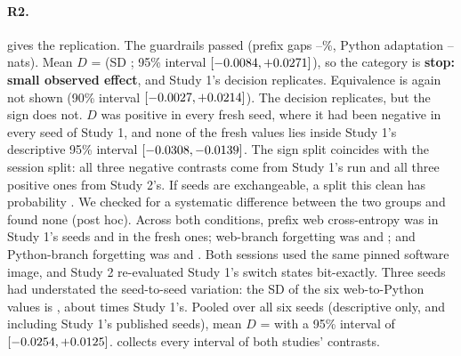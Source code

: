 \documentclass[11pt]{article}
\begin{document}
\begin{table}[t]
\centering
\small
\caption{R2: the web $\to$ Python contrast $D$ on the fresh seeds, with Study 1's estimand and rules (nats/token;
full development set). ``Code gain'' is the drop in non-W Python cross-entropy from the switch. Study 1's seeds
101--103 are in \cref{tab:primary}.}
\label{tab:s2replication}

\end{table}

\paragraph{R2.}  gives the replication. The guardrails passed (prefix gaps
\repGapMin--\repGapMax\%, Python adaptation \repAdaptMin--\repAdaptMax{} nats). Mean $D$ = \repDmean{} (SD
\repDsd; 95\% interval $[-0.0084, {+}0.0271]$), so the category is \textbf{stop: small observed effect}, and Study
1's decision replicates. Equivalence is again not shown (90\% interval $[-0.0027, {+}0.0214]$). The
decision replicates, but the sign does not. $D$ was positive in every fresh seed, where it had been negative in
every seed of Study 1, and none of the fresh values lies inside Study 1's descriptive 95\% interval
$[-0.0308, -0.0139]$. The sign split coincides with the session split: all three negative contrasts come from Study 1's
run and all three positive ones from Study 2's. If seeds are exchangeable, a split this clean has probability
\splitProb. We checked for a systematic difference between the two groups and found none (post hoc). Across both
conditions, prefix web cross-entropy was \splitPrefixPilot{} in Study 1's seeds and \splitPrefixFresh{} in the
fresh ones; web-branch forgetting was \splitFwebPilot{} and \splitFwebFresh; and Python-branch forgetting was
\splitFpyPilot{} and \splitFpyFresh. Both sessions used the same pinned software image, and Study 2 re-evaluated
Study 1's switch states bit-exactly. Three seeds had understated the seed-to-seed variation: the SD of the six
web-to-Python values is \poolSd, about \poolSdRatio{} times Study 1's. Pooled over all six seeds (descriptive only, and including Study 1's
published seeds), mean $D$ = \poolMean{} with a 95\% interval of $[-0.0254, {+}0.0125]$. 
collects every interval of both studies' contrasts.
\end{document}
